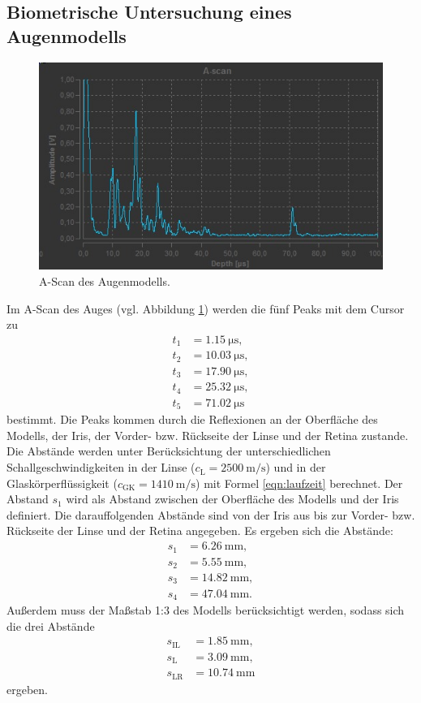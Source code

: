 \subsection{Biometrische Untersuchung eines Augenmodells}
\begin{figure}
  \centering
  \includegraphics{Messdaten/auge_ascan.jpg}
  \caption{A-Scan des Augenmodells.}
  \label{fig:auge_ascan}
\end{figure}
Im A-Scan des Auges (vgl. Abbildung \ref{fig:auge_ascan}) werden die fünf Peaks mit dem Cursor
zu
\begin{align*}
	t_1 &= \SI{1,15}{\micro\second} \mathrm{,} \\
	t_2 &= \SI{10,03}{\micro\second} \mathrm{,}\\
	t_3 &= \SI{17,90}{\micro\second} \mathrm{,}\\
	t_4 &= \SI{25,32}{\micro\second} \mathrm{,}\\
	t_5 &= \SI{71,02}{\micro\second}
\end{align*}
bestimmt. Die Peaks kommen durch die Reflexionen an der Oberfläche des Modells, der Iris, der
Vorder- bzw. Rückseite der Linse und der Retina zustande. Die Abstände werden unter 
Berücksichtung der unterschiedlichen Schallgeschwindigkeiten in der Linse ($c_{\mathrm{L}} = 
\SI{2500}{\meter\per\second}$) und in der Glaskörperflüssigkeit ($c_{\mathrm{GK}} = 
\SI{1410}{\meter\per\second}$) mit Formel \eqref{eqn:laufzeit} berechnet.
Der Abstand $s_1$ wird als Abstand zwischen der Oberfläche des Modells und der Iris 
definiert. Die darauffolgenden Abstände sind von der Iris aus bis zur Vorder- bzw. Rückseite 
der Linse und der Retina angegeben. Es ergeben sich die Abstände:
\begin{align*}
	s_1 &= \SI{6,26}{\milli\meter} \mathrm{,} \\
	s_2 &= \SI{5,55}{\milli\meter} \mathrm{,} \\
	s_3 &= \SI{14,82}{\milli\meter} \mathrm{,} \\
	s_4 &= \SI{47,04}{\milli\meter} \mathrm{.}
\end{align*}
Außerdem muss der Maßstab 1:3 des Modells berücksichtigt werden, sodass sich die drei Abstände
\begin{align*}
	s_{\mathrm{IL}} &= \SI{1,85}{\milli\meter} \mathrm{,} \\
	s_{\mathrm{L}} &= \SI{3,09}{\milli\meter} \mathrm{,} \\
	s_{\mathrm{LR}} &= \SI{10,74}{\milli\meter}
\end{align*}
ergeben.
